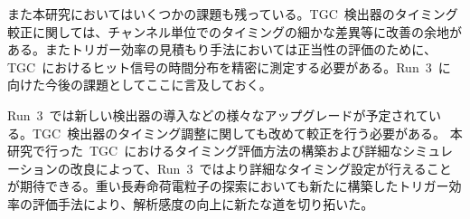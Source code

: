 また本研究においてはいくつかの課題も残っている。TGC~検出器のタイミング較正に関しては、チャンネル単位でのタイミングの細かな差異等に改善の余地がある。またトリガー効率の見積もり手法においては正当性の評価のために、TGC~におけるヒット信号の時間分布を精密に測定する必要がある。Run~3~に向けた今後の課題としてここに言及しておく。

Run~3~では新しい検出器の導入などの様々なアップグレードが予定されている。TGC~検出器のタイミング調整に関しても改めて較正を行う必要がある。
本研究で行った~TGC~におけるタイミング評価方法の構築および詳細なシミュレーションの改良によって、Run~3~ではより詳細なタイミング設定が行えることが期待できる。重い長寿命荷電粒子の探索においても新たに構築したトリガー効率の評価手法により、解析感度の向上に新たな道を切り拓いた。